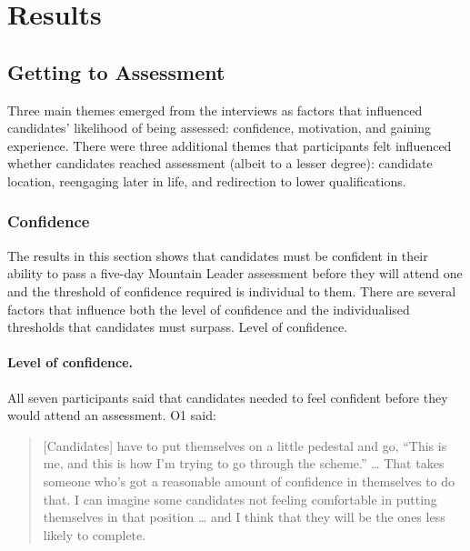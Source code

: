 \documentclass[a4paper,]{book}
\let\oldparagraph\paragraph
\renewcommand{\paragraph}[1]{\oldparagraph{#1}\mbox{}}
\begin{document}
\hypertarget{results}{%
\section{Results}\label{results}}

\hypertarget{getting-to-assessment}{%
\subsection{Getting to Assessment}\label{getting-to-assessment}}

Three main themes emerged from the interviews as factors that influenced candidates' likelihood of being assessed: confidence, motivation, and gaining experience. There were three additional themes that participants felt influenced whether candidates reached assessment (albeit to a lesser degree): candidate location, reengaging later in life, and redirection to lower qualifications.

\hypertarget{confidence}{%
\subsubsection{Confidence}\label{confidence}}

The results in this section shows that candidates must be confident in their ability to pass a five-day Mountain Leader assessment before they will attend one and the threshold of confidence required is individual to them. There are several factors that influence both the level of confidence and the individualised thresholds that candidates must surpass. Level of confidence.

\hypertarget{level-of-confidence.}{%
\paragraph{Level of confidence.}\label{level-of-confidence.}}

All seven participants said that candidates needed to feel confident before they would attend an assessment. O1 said:

\begin{quote}
{[}Candidates{]} have to put themselves on a little pedestal and go, ``This is me, and this is how I'm trying to go through the scheme.'' \ldots{} That takes someone who's got a reasonable amount of confidence in themselves to do that. I can imagine some candidates not feeling comfortable in putting themselves in that position \ldots{} and I think that they will be the ones less likely to complete.
\end{quote}
\end{document}
